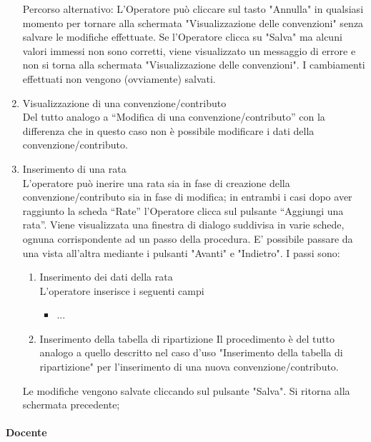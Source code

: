 \begin{enumerate}
  Percorso alternativo:
  L'Operatore può cliccare sul tasto "Annulla" in qualsiasi momento per tornare alla schermata "Visualizzazione delle convenzioni" senza salvare le modifiche effettuate.
  Se l'Operatore clicca su "Salva" ma alcuni valori immessi non sono corretti, viene visualizzato un messaggio di errore e non si torna alla schermata "Visualizzazione delle
  convenzioni". I cambiamenti effettuati non vengono (ovviamente) salvati.
  
\item Visualizzazione di una convenzione/contributo\\
 
  Del tutto analogo a ``Modifica di una convenzione/contributo'' con la differenza che in questo caso non è possibile modificare i dati della
  convenzione/contributo.
  
  
\item Inserimento di una rata\\
L'operatore può inerire una rata sia in fase di creazione della convenzione/contributo sia in fase di modifica; in entrambi i casi dopo aver raggiunto
la scheda ``Rate'' l'Operatore clicca sul pulsante ``Aggiungi una rata''.  
Viene visualizzata una finestra di dialogo suddivisa in varie schede,
ognuna corrispondente ad un passo della procedura. E' possibile passare da una vista all'altra mediante i pulsanti "Avanti" e "Indietro". I passi sono:
\begin{enumerate}
  \item Inserimento dei dati della rata\\
  
  L'operatore inserisce i seguenti campi
    \begin{itemize}
    \item ...
    \end{itemize}
  \item Inserimento della tabella di ripartizione
  Il procedimento è del tutto analogo  a quello descritto nel caso d'uso "Inserimento della tabella di ripartizione" per l'inserimento di 
  una nuova convenzione/contributo. 
\end{enumerate}

Le modifiche vengono salvate cliccando sul pulsante "Salva". Si ritorna alla schermata precedente;


\end{enumerate}

 
\paragraph{Docente}

